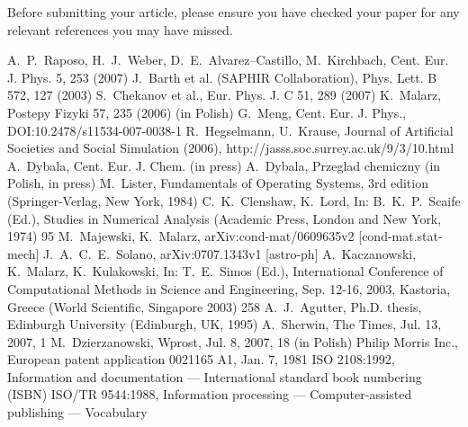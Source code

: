 \documentclass{lpaper} %
\begin{document}
Before submitting your article, please ensure you have checked your paper for any relevant references you may have missed.


\begin{thebibliography}{99}
 A.~P.~Raposo, H.~J.~Weber, D.~E.~Alvarez--Castillo, M.~Kirchbach, Cent. Eur. J. Phys. 5, 253 (2007)
 J.~Barth et al. (SAPHIR Collaboration), Phys. Lett. B 572, 127 (2003)
 S.~Chekanov et al., Eur. Phys. J. C 51, 289 (2007)
 K.~Malarz, Postepy Fizyki 57, 235 (2006) (in Polish)
 G.~Meng, Cent. Eur. J. Phys., DOI:10.2478/s11534-007-0038-1
 R.~Hegselmann, U.~Krause, Journal of Artificial Societies and Social Simulation (2006), http://jasss.soc.surrey.ac.uk/9/3/10.html
 A.~Dybala, Cent. Eur. J. Chem. (in press)
 A.~Dybala, Przeglad chemiczny (in Polish, in press)
 M.~Lister, Fundamentals of Operating Systems, 3rd edition (Springer-Verlag, New York, 1984)
 C.~K.~Clenshaw, K.~Lord, In: B.~K.~P.~Scaife (Ed.), Studies in Numerical Analysis (Academic Press, London and New York, 1974) 95
 M.~Majewski, K.~Malarz, arXiv:cond-mat/0609635v2 [cond-mat.stat-mech]
 J.~A.~C.~E.~Solano, arXiv:0707.1343v1 [astro-ph]
 A.~Kaczanowski, K.~Malarz, K.~Kulakowski, In: T.~E.~Simos (Ed.), International Conference of Computational Methods in Science and Engineering, Sep. 12-16, 2003, Kastoria, Greece (World Scientific, Singapore 2003) 258
 A.~J.~Agutter, Ph.D. thesis, Edinburgh University (Edinburgh, UK, 1995)
 A.~Sherwin, The Times, Jul. 13, 2007, 1
 M.~Dzierzanowski, Wprost, Jul. 8, 2007, 18 (in Polish)
 Philip Morris Inc., European patent application 0021165 A1, Jan. 7, 1981
 ISO 2108:1992, Information and documentation --- International standard book numbering (ISBN)
 ISO/TR 9544:1988, Information processing --- Computer-assisted publishing --- Vocabulary
\end{thebibliography}
\end{document}
